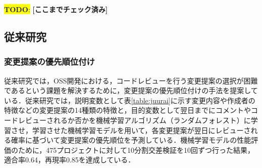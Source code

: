\documentclass[submit,ses,noauthor]{ipsj}
\newcommand{\todo}[1]{\colorbox{yellow}{{\bf TODO}:}{\color{red} {\textbf{[#1]}}}}
\begin{document}
\todo{ここまでチェック済み}


\subsection{従来研究}

\subsubsection{変更提案の優先順位付け}
従来研究では，OSS開発における，コードレビューを行う変更提案の選択が困難であるという課題を解決するために，変更提案の優先順位付けの手法を提案している．従来研究では，説明変数として表\ref{table:juurai}に示す変更内容や作成者の特徴などの変更提案の14種類の特徴と，目的変数として翌日までにコメントやコードレビューされるか否かを機械学習アルゴリズム（ランダムフォレスト）に学習させ，学習させた機械学習モデルを用いて，各変更提案が翌日にレビューされる確率に基づいて変更提案の優先順位を予測している\cite{prioritizer}．機械学習モデルの性能評価のために，475プロジェクトに対して10分割交差検証を10回ずつ行った結果，適合率0.64，再現率0.85を達成している．

\end{document}
